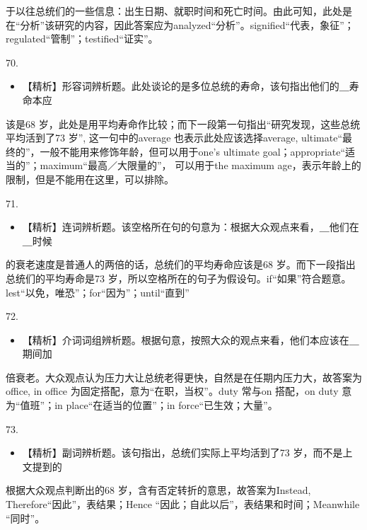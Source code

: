\documentclass[UTF8,11pt]{ctexart}
\begin{document}
于以往总统们的一些信息：出生日期、就职时间和死亡时间。由此可知，此处是在“分析”该研究的内容，因此答案应为analyzed“分析”。signified“代表，象征”；regulated“管制”；testified“证实”。


70.


\begin{itemize}[leftmargin=2em,itemsep=.2em,topsep=.4em]\item[B.] 【精析】形容词辨析题。此处谈论的是多位总统的寿命，该句指出他们的＿寿命本应
\end{itemize}

该是68 岁，此处是用平均寿命作比较；而下一段第一句指出“研究发现，这些总统平均活到了73 岁”, 这一句中的average 也表示此处应该选择average, ultimate“最终的”，一般不能用来修饰年龄，但可以用于one's ultimate goal；appropriate“适当的”；maximum“最高／大限量的”， 可以用于the maximum age，表示年龄上的限制，但是不能用在这里，可以排除。


71.


\begin{itemize}[leftmargin=2em,itemsep=.2em,topsep=.4em]\item[A.] 【精析】连词辨析题。该空格所在句的句意为：根据大众观点来看，＿他们在＿时候
\end{itemize}

的衰老速度是普通人的两倍的话，总统们的平均寿命应该是68 岁。而下一段指出总统们的平均寿命是73 岁，所以空格所在的句子为假设句。if“如果”符合题意。lest“以免，唯恐”；for“因为”；until“直到”


72.


\begin{itemize}[leftmargin=2em,itemsep=.2em,topsep=.4em]\item[C.] 【精析】介词词组辨析题。根据句意，按照大众的观点来看，他们本应该在＿期间加
\end{itemize}

倍衰老。大众观点认为压力大让总统老得更快，自然是在任期内压力大，故答案为office, in office 为固定搭配，意为“在职，当权”。duty 常与on 搭配，on duty 意为“值班”；in place“在适当的位置”；in force“已生效；大量”。


73.


\begin{itemize}[leftmargin=2em,itemsep=.2em,topsep=.4em]\item[A.] 【精析】副词辨析题。该句指出，总统们实际上平均活到了73 岁，而不是上文提到的
\end{itemize}

根据大众观点判断出的68 岁，含有否定转折的意思，故答案为Instead, Therefore“因此”，表结果；Hence “因此；自此以后”，表结果和时间；Meanwhile “同时”。
\end{document}
